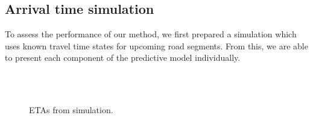 \subsection{Arrival time simulation}
\label{sec:arrival_simulation}

To assess the performance of our method, we first prepared a simulation which uses known travel time states for upcoming road segments. From this, we are able to present each component of the predictive model individually.


\begin{knitrout}
\color{fgcolor}\begin{figure}

{\centering {}\\
\\

}

\caption[ETAs from simulation]{ETAs from simulation.}\label{fig:arrival_simulation}
\end{figure}


\end{knitrout}
